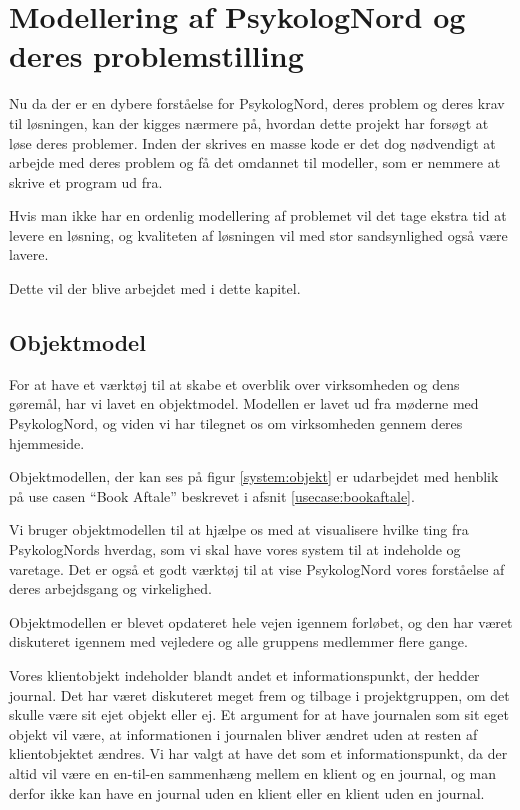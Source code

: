 \section{Modellering af PsykologNord og deres problemstilling}

Nu da der er en dybere forståelse for PsykologNord, deres problem og deres krav til løsningen, kan der kigges nærmere på, hvordan dette projekt har forsøgt at løse deres problemer.
Inden der skrives en masse kode er det dog nødvendigt at arbejde med deres problem og få det omdannet til modeller, som er nemmere at skrive et program ud fra.

Hvis man ikke har en ordenlig modellering af problemet vil det tage ekstra tid at levere en løsning, og kvaliteten af løsningen vil med stor sandsynlighed også være lavere.

Dette vil der blive arbejdet med i dette kapitel.

\subsection{Objektmodel}

For at have et værktøj til at skabe et overblik over virksomheden og dens gøremål, har vi lavet en objektmodel.
Modellen er lavet ud fra møderne med PsykologNord, og viden vi har tilegnet os om virksomheden gennem deres hjemmeside.\cite{psykolognord}

Objektmodellen, der kan ses på figur \ref{system:objekt} er udarbejdet med henblik på use casen ``Book Aftale'' beskrevet i afsnit \ref{usecase:bookaftale}.

Vi bruger objektmodellen til at hjælpe os med at visualisere hvilke ting fra PsykologNords hverdag, som vi skal have vores system til at indeholde og varetage.
Det er også et godt værktøj til at vise PsykologNord vores forståelse af deres arbejdsgang og virkelighed.

Objektmodellen er blevet opdateret hele vejen igennem forløbet, og den har været diskuteret igennem med vejledere og alle gruppens medlemmer flere gange.

Vores klientobjekt indeholder blandt andet et informationspunkt, der hedder journal.
Det har været diskuteret meget frem og tilbage i projektgruppen, om det skulle være sit ejet objekt eller ej.
Et argument for at have journalen som sit eget objekt vil være, at informationen i journalen bliver ændret uden at resten af klientobjektet ændres.
Vi har valgt at have det som et informationspunkt, da der altid vil være en en-til-en sammenhæng mellem en klient og en journal, og man derfor ikke kan have en journal uden en klient eller en klient uden en journal.

